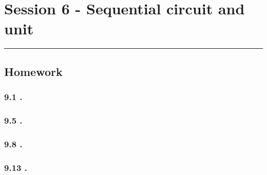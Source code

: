 \section{Session 6 - Sequential circuit and unit}
\vspace{-15pt}\noindent\rule{\textwidth}{0.1pt}\vspace{-10pt}
    \subsection{Homework}
    \subsubsection{9.1 \textnormal{}.}
    {\color{hwSolution}

    }

    \subsubsection{9.5 \textnormal{}.}
    {\color{hwSolution}

    }

    \subsubsection{9.8 \textnormal{}.}
    {\color{hwSolution}

    }

    \subsubsection{9.13 \textnormal{}.}
    {\color{hwSolution}

    }